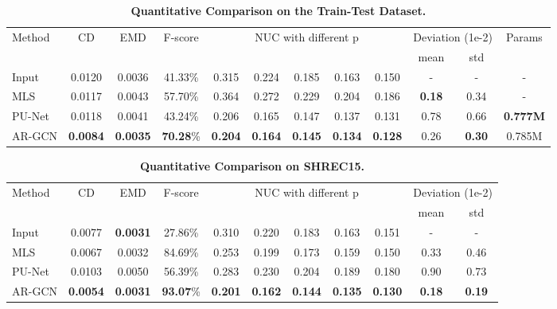 \documentclass[10pt,twocolumn,letterpaper]{article}
\begin{document}
\begin{table*}[ht]
\small
\begin{center}
\begin{tabular}{l|cc|c|ccccc|cc|c}
\hline
\multirow{2}{*}{Method} & \multirow{2}{*}{CD} & \multirow{2}{*}{EMD} & \multicolumn{1}{c}{F-score} & \multicolumn{5}{|c}{NUC with different p} & \multicolumn{2}{|c|}{Deviation (1e-2)} & \multirow{2}{*}{Params}\\
\cline{4-11}
& & &  &  &  &  &  &  & mean & std \\
\hline
\hline
Input & 0.0120 & 0.0036 & 41.33\%  & 0.315 & 0.224 & 0.185 & 0.163 & 0.150 & - & - & -\\
MLS~\cite{alexa2003computing} & 0.0117 & 0.0043 & 57.70\% & 0.364 & 0.272 & 0.229 & 0.204 & 0.186 & \textbf{0.18} & 0.34 & -\\
PU-Net~\cite{yu2018pu} & 0.0118 & 0.0041 & 43.24\% & 0.206 & 0.165 & 0.147 & 0.137 & 0.131 & 0.78 & 0.66 & \textbf{0.777M}\\
\hline
AR-GCN & \textbf{0.0084} & \textbf{0.0035} & \textbf{70.28}\% & \textbf{0.204} & \textbf{0.164} & \textbf{0.145} & \textbf{0.134} & \textbf{0.128} & 0.26 & \textbf{0.30} & 0.785M\\
\hline
\end{tabular}
\end{center}
	\vspace{-1.5em}
	\caption{\textbf{Quantitative Comparison on the Train-Test Dataset.}}
	\label{table:pu_result}
\end{table*}

\begin{table*}[ht]
\begin{center}
\begin{tabular}{l|cc|c|ccccc|cc}
\hline
\multirow{2}{*}{Method} & \multirow{2}{*}{CD} & \multirow{2}{*}{EMD} & \multicolumn{1}{c}{F-score} & \multicolumn{5}{|c}{NUC with different p} & \multicolumn{2}{|c}{Deviation (1e-2)}\\
\cline{4-11}
& & &  &  &  &  &  &  & mean & std \\
\hline
\hline
Input & 0.0077 & \textbf{0.0031} & 27.86\% & 0.310 & 0.220 & 0.183 & 0.163 & 0.151 & - & - \\
MLS~\cite{alexa2003computing} & 0.0067 & 0.0032 & 84.69\% & 0.253 & 0.199 & 0.173 & 0.159 & 0.150 & 0.33 & 0.46\\
PU-Net~\cite{yu2018pu} & 0.0103 & 0.0050 & 56.39\% & 0.283 & 0.230 & 0.204 & 0.189 & 0.180 & 0.90 & 0.73\\
\hline
AR-GCN & \textbf{0.0054} & \textbf{0.0031} & \textbf{93.07}\% & \textbf{0.201} & \textbf{0.162} & \textbf{0.144} & \textbf{0.135} & \textbf{0.130} & \textbf{0.18} & \textbf{0.19}\\
\hline
\end{tabular}
\end{center}
	\vspace{-1.5em}
	\caption{\textbf{Quantitative Comparison on SHREC15.}}
	\vspace{-1em}
	\label{table:shrec_result}
\end{table*}
\end{document}
